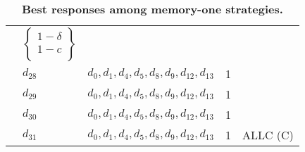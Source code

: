 \documentclass[11pt]{article}
\begin{document}
\begin{table}
{\begin{tabular}{lllll}
        & $\left\{\begin{array}{c} 
        1 - \delta \\
        1 - c \\ \end{array}\right\}$ & \\
     &              $ d_{28} $ & $d_{0}, d_{1}, d_{4}, d_{5}, d_{8}, d_{9}, d_{12}, d_{13}$ & 1 & \\
     &              $ d_{29} $ & $d_{0}, d_{1}, d_{4}, d_{5}, d_{8}, d_{9}, d_{12}, d_{13}$ & 1 & \\
     &              $ d_{30} $ & $d_{0}, d_{1}, d_{4}, d_{5}, d_{8}, d_{9}, d_{12}, d_{13}$ & 1 & \\
     &              $ d_{31} $ & $d_{0}, d_{1}, d_{4}, d_{5}, d_{8}, d_{9}, d_{12}, d_{13}$ & 1 & ALLC (C) \\
    \bottomrule
    \end{tabular}}
    \caption{\textbf{Best responses among memory-one strategies.}}\label{table:best_responses}
\end{table}
\end{document}
